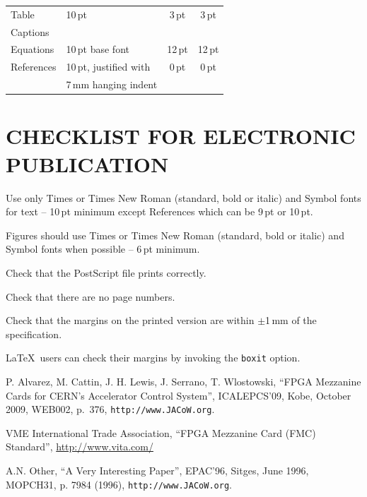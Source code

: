 \documentclass{JAC2003}
\begin{document}
\begin{table}
\begin{tabular}{llcc}
        \midrule
         Table         & 10\,pt                      & 3\,pt           & 3\,pt  \\
         Captions      &                             &                 &      \\
        \midrule
         Equations     & 10\,pt base font            & 12\,pt          & 12\,pt \\
        \midrule
         References    & 10\,pt, justified with      & 0\,pt           & 0\,pt  \\
                       & 7\,mm hanging indent          &                 &      \\
        \bottomrule
    \end{tabular}
\end{table}


\section{CHECKLIST FOR ELECTRONIC PUBLICATION}

\begin{Itemize}
    \item  Use only Times or Times New Roman (standard, bold or italic) and Symbol 
    			fonts for text -- 10\,pt minimum except References which can be 9\,pt or 10\,pt.
    \item  Figures should use Times or Times New Roman (standard, bold or italic) and Symbol fonts when possible
            -- 6\,pt minimum.
    \item  Check that the PostScript file prints correctly.
    \item  Check that there are no page numbers.
    \item  Check that the margins on the printed version are within $\pm$1\,mm of the specification.
    \item  \LaTeX\ users can check their margins by invoking the
           \texttt{boxit} option.
\end{Itemize}

\begin{thebibliography}{9}   %

P. Alvarez, M. Cattin, J. H. Lewis, J. Serrano, T. Wlostowski,
``FPGA Mezzanine Cards for CERN’s Accelerator Control System'',
ICALEPCS'09, Kobe, October 2009, WEB002, p.~376,
\texttt{http://www.JACoW.org}.

VME International Trade Association,
``FPGA Mezzanine Card (FMC) Standard'', \url{http://www.vita.com/}

A.N. Other, ``A Very Interesting Paper'', EPAC'96, Sitges, June 1996, MOPCH31, p. 7984 (1996),
\texttt{http://www.JACoW.org}.

\end{thebibliography}
\end{document}
